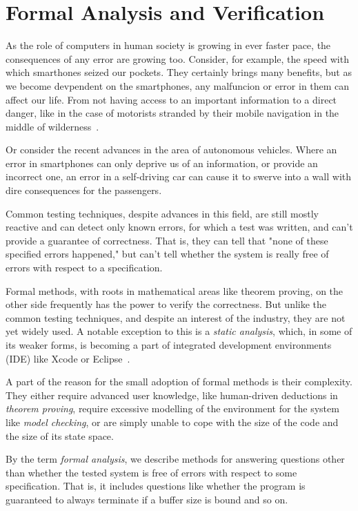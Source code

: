 
\chapter{Formal Analysis and Verification} \label{chap:fav}
As the role of computers in human society is growing in ever faster pace, the consequences of any error are growing too. Consider, for example, the speed with which smarthones seized our pockets. They certainly brings many benefits, but as we become devpendent on the smartphones, any malfuncion or error in them can affect our life. From not having access to an important information to a direct danger, like in the case of motorists stranded by their mobile navigation in the middle of wilderness~\cite{appleMaps}.

Or consider the recent advances in the area of autonomous vehicles. Where an error in smartphones can only deprive us of an information, or provide an incorrect one, an error in a self-driving car can cause it to swerve into a wall with dire consequences for the passengers.

Common testing techniques, despite advances in this field, are still mostly reactive and can detect only known errors, for which a test was written, and can't provide a guarantee of correctness. That is, they can tell that "none of these specified errors happened," but can't tell whether the system is really free of errors with respect to a specification.

Formal methods, with roots in mathematical areas like theorem proving, on the other side frequently has the power to verify the correctness. But unlike the common testing techniques, and despite an interest of the industry, they are not yet widely used. A notable exception to this is a {\em static analysis}, which, in some of its weaker forms, is becoming a part of integrated development environments (IDE) like Xcode or Eclipse~\cite{xcodeAnalysis}.

A part of the reason for the small adoption of formal methods is their complexity. They either require advanced user knowledge, like human-driven deductions in {\em theorem proving}, require excessive modelling of the environment for the system like {\em model checking}, or are simply unable to cope with the size of the code and the size of its state space.

By the term {\em formal analysis}, we describe methods for answering questions other than whether the tested system is free of errors with respect to some specification. That is, it includes questions like whether the program is guaranteed to always terminate if a buffer size is bound and so on.

